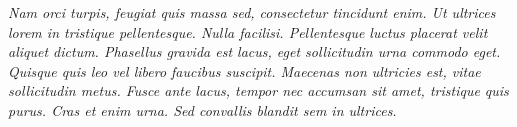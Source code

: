 \textit{Nam orci turpis, feugiat quis massa sed, consectetur tincidunt enim. Ut ultrices lorem in tristique pellentesque. Nulla facilisi. Pellentesque luctus placerat velit aliquet dictum. Phasellus gravida est lacus, eget sollicitudin urna commodo eget. Quisque quis leo vel libero faucibus suscipit. Maecenas non ultricies est, vitae sollicitudin metus. Fusce ante lacus, tempor nec accumsan sit amet, tristique quis purus. Cras et enim urna. Sed convallis blandit sem in ultrices.}

